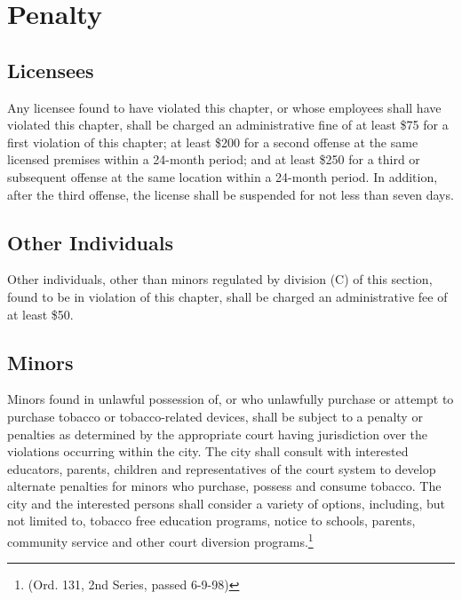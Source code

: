\setcounter{section}{98}
\section{Penalty}
\subsection{Licensees}
Any licensee found to have violated this chapter, or whose employees shall have violated this chapter, shall be charged an administrative fine of at least \$75 for a first violation of this chapter; at least \$200 for a second offense at the same licensed premises within a 24-month period; and at least \$250 for a third or subsequent offense at the same location within a 24-month period.  In addition, after the third offense, the license shall be suspended for not less than seven days.
\subsection{Other Individuals}
Other individuals, other than minors regulated by division (C) of this section, found to be in violation of this chapter, shall be charged an administrative fee of at least \$50.
\subsection{Minors}
Minors found in unlawful possession of, or who unlawfully purchase or attempt to purchase tobacco or tobacco-related devices, shall be subject to a penalty or penalties as determined by the appropriate court having jurisdiction over the violations occurring within the city.  The city shall consult with interested educators, parents, children and representatives of the court system to develop alternate penalties for minors who purchase, possess and consume tobacco.  The city and the interested persons shall consider a variety of options, including, but not limited to, tobacco free education programs, notice to schools, parents, community service and other court diversion programs.\footnote{(Ord. 131, 2nd Series, passed 6-9-98)}
